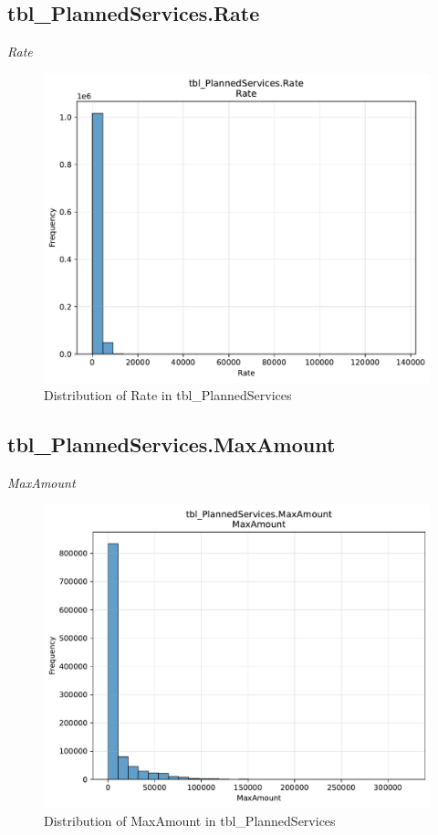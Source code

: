 \subsection{tbl\_PlannedServices.Rate}
\textit{Rate}

\begin{figure}[htbp]
\centering
\includegraphics[width=\textwidth]{figures/dbo_tbl_PlannedServices_Rate.pdf}
\caption{Distribution of Rate in tbl\_PlannedServices}
\end{figure}\newpage

\subsection{tbl\_PlannedServices.MaxAmount}
\textit{MaxAmount}

\begin{figure}[htbp]
\centering
\includegraphics[width=\textwidth]{figures/dbo_tbl_PlannedServices_MaxAmount.pdf}
\caption{Distribution of MaxAmount in tbl\_PlannedServices}
\end{figure}\newpage

